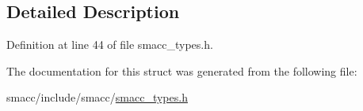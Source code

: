 \subsection{Detailed Description}


Definition at line 44 of file smacc\+\_\+types.\+h.



The documentation for this struct was generated from the following file\+:\begin{DoxyCompactItemize}
\item 
smacc/include/smacc/\hyperlink{smacc__types_8h}{smacc\+\_\+types.\+h}\end{DoxyCompactItemize}
